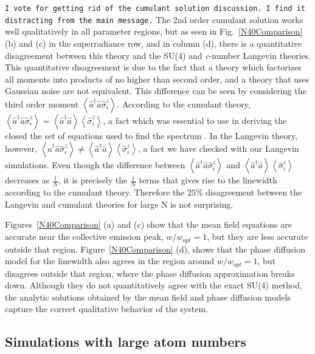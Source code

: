 \documentclass[aps,
twocolumn,
superscriptaddress,groupedaddress]{revtex4}
\newcommand{\dmcomment}[1]{{\tt #1}}
\begin{document}
{\dmcomment{I vote for getting rid of the cumulant solution discussion.
I find it distracting from the main message.}
The 2nd order cumulant solution works well qualitatively in all
parameter regions, but as seen in Fig.~\ref{N40Comparison} (b) and (c)
in the superradiance row, and in column (d), there is a quantitative
disagreement between this theory and the SU(4) and {\it c}-number Langevin
theories. This quantitative disagreement is due to the fact that a theory which factorizes all moments
into products of no higher than second order, and a theory that
uses Gaussian noise are not equivalent. This difference can be seen by considering the
third order moment $\left< \hat{a}^{\dagger}\hat{a}\hat{\sigma}_i^z
\right>$. According to the cumulant theory, $\left<
\hat{a}^{\dagger}\hat{a}\hat{\sigma}_i^z \right>=\left<
\hat{a}^{\dagger}\hat{a}\right> \left<\hat{\sigma}_i^z \right>$, a fact
which was essential to use in deriving the closed the set of equations
used to find the spectrum \cite{PhysRevLett.102.163601}. In the Langevin
theory, however, $\left< \hat{a}^{\dagger}\hat{a}\hat{\sigma}_i^z
\right> \neq \left< \hat{a}^{\dagger}\hat{a}\right>
\left<\hat{\sigma}_i^z \right>$, a fact we have checked with our
Langevin simulations. Even though the difference between $\left<
\hat{a}^{\dagger}\hat{a}\hat{\sigma}_i^z \right>$ and $\left<
\hat{a}^{\dagger}\hat{a}\right> \left<\hat{\sigma}_i^z \right>$
decreases as $\frac{1}{N}$, it is precisely the $\frac{1}{N}$ terms that
gives rise to the linewidth according to the cumulant theory.  Therefore
the $25\%$ disagreement between the Langevin and cumulant theories for
large N is not surprising.
\fi

Figures~\ref{N40Comparison} (a) and (c) show that the mean field
equations are accurate near the collective emission peak, $w/w_{opt}=1$,
but they are less accurate outside that region.
Figure~\ref{N40Comparison} (d), shows that the phase diffusion model for
the linewidth also agrees in the region around $w/w_{opt}=1$, but
disagrees outside that region, where the phase diffusion approximation
breaks down.  Although they do not quantitatively agree with the exact
SU(4) method, the analytic solutions obtained by the mean field and
phase diffusion models capture the correct qualitative behavior of the
system.


\subsection{Simulations with large atom numbers}

}
\end{document}
